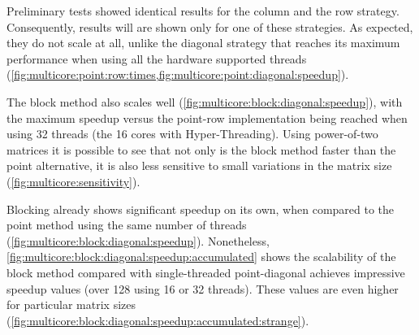 \documentclass[../thesis]{subfiles}
\begin{document}
	Preliminary tests showed identical results for the column and the row strategy. Consequently, results will are shown only for one of these strategies. As expected, they do not scale at all, unlike the diagonal strategy that reaches its maximum performance when using all the hardware supported threads (\cref{fig:multicore:point:row:times,fig:multicore:point:diagonal:speedup}).

	The block method also scales well (\cref{fig:multicore:block:diagonal:speedup}), with the maximum speedup versus the point-row implementation being reached when using 32 threads (the 16 cores with Hyper-Threading). Using power-of-two matrices it is possible to see that not only is the block method faster than the point alternative, it is also less sensitive to small variations in the matrix size (\cref{fig:multicore:sensitivity}).


	Blocking already shows significant speedup on its own, when compared to the point method using the same number of threads (\cref{fig:multicore:block:diagonal:speedup}). Nonetheless, \cref{fig:multicore:block:diagonal:speedup:accumulated} shows the scalability of the block method compared with single-threaded point-diagonal achieves impressive speedup values (over 128 using 16 or 32 threads). These values are even higher for particular matrix sizes (\cref{fig:multicore:block:diagonal:speedup:accumulated:strange}).
\end{document}
